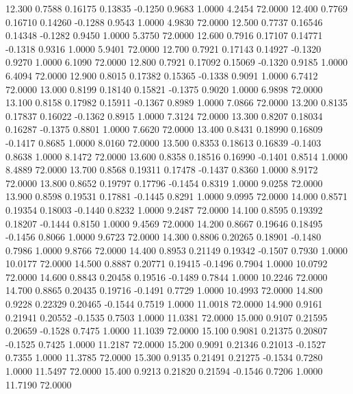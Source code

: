   12.300   0.7588   0.16175   0.13835  -0.1250   0.9683   1.0000   4.2454  72.0000
  12.400   0.7769   0.16710   0.14260  -0.1288   0.9543   1.0000   4.9830  72.0000
  12.500   0.7737   0.16546   0.14348  -0.1282   0.9450   1.0000   5.3750  72.0000
  12.600   0.7916   0.17107   0.14771  -0.1318   0.9316   1.0000   5.9401  72.0000
  12.700   0.7921   0.17143   0.14927  -0.1320   0.9270   1.0000   6.1090  72.0000
  12.800   0.7921   0.17092   0.15069  -0.1320   0.9185   1.0000   6.4094  72.0000
  12.900   0.8015   0.17382   0.15365  -0.1338   0.9091   1.0000   6.7412  72.0000
  13.000   0.8199   0.18140   0.15821  -0.1375   0.9020   1.0000   6.9898  72.0000
  13.100   0.8158   0.17982   0.15911  -0.1367   0.8989   1.0000   7.0866  72.0000
  13.200   0.8135   0.17837   0.16022  -0.1362   0.8915   1.0000   7.3124  72.0000
  13.300   0.8207   0.18034   0.16287  -0.1375   0.8801   1.0000   7.6620  72.0000
  13.400   0.8431   0.18990   0.16809  -0.1417   0.8685   1.0000   8.0160  72.0000
  13.500   0.8353   0.18613   0.16839  -0.1403   0.8638   1.0000   8.1472  72.0000
  13.600   0.8358   0.18516   0.16990  -0.1401   0.8514   1.0000   8.4889  72.0000
  13.700   0.8568   0.19311   0.17478  -0.1437   0.8360   1.0000   8.9172  72.0000
  13.800   0.8652   0.19797   0.17796  -0.1454   0.8319   1.0000   9.0258  72.0000
  13.900   0.8598   0.19531   0.17881  -0.1445   0.8291   1.0000   9.0995  72.0000
  14.000   0.8571   0.19354   0.18003  -0.1440   0.8232   1.0000   9.2487  72.0000
  14.100   0.8595   0.19392   0.18207  -0.1444   0.8150   1.0000   9.4569  72.0000
  14.200   0.8667   0.19646   0.18495  -0.1456   0.8066   1.0000   9.6723  72.0000
  14.300   0.8806   0.20265   0.18901  -0.1480   0.7986   1.0000   9.8766  72.0000
  14.400   0.8953   0.21149   0.19342  -0.1507   0.7930   1.0000  10.0177  72.0000
  14.500   0.8887   0.20771   0.19415  -0.1496   0.7904   1.0000  10.0792  72.0000
  14.600   0.8843   0.20458   0.19516  -0.1489   0.7844   1.0000  10.2246  72.0000
  14.700   0.8865   0.20435   0.19716  -0.1491   0.7729   1.0000  10.4993  72.0000
  14.800   0.9228   0.22329   0.20465  -0.1544   0.7519   1.0000  11.0018  72.0000
  14.900   0.9161   0.21941   0.20552  -0.1535   0.7503   1.0000  11.0381  72.0000
  15.000   0.9107   0.21595   0.20659  -0.1528   0.7475   1.0000  11.1039  72.0000
  15.100   0.9081   0.21375   0.20807  -0.1525   0.7425   1.0000  11.2187  72.0000
  15.200   0.9091   0.21346   0.21013  -0.1527   0.7355   1.0000  11.3785  72.0000
  15.300   0.9135   0.21491   0.21275  -0.1534   0.7280   1.0000  11.5497  72.0000
  15.400   0.9213   0.21820   0.21594  -0.1546   0.7206   1.0000  11.7190  72.0000
